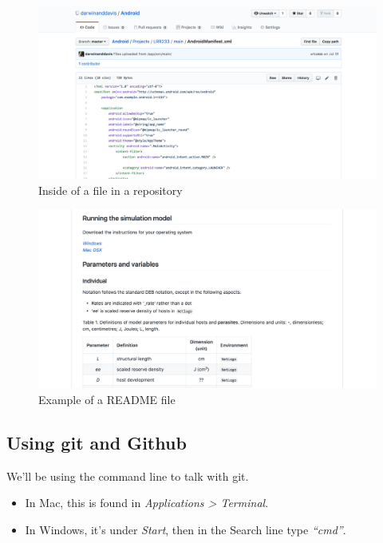 \documentclass[10,portrait]{article}
\providecommand{\tightlist}{%
  \setlength{\itemsep}{0pt}\setlength{\parskip}{0pt}}
\begin{document}
\begin{figure}
\centering
\includegraphics{filepage.png}
\caption{Inside of a file in a repository}
\end{figure}

\begin{figure}
\centering
\includegraphics{readme.png}
\caption{Example of a README file}
\end{figure}

\newpage     

\subsection{Using git and Github}\label{using-git-and-github}

We'll be using the command line to talk with git.

\begin{itemize}
\tightlist
\item
  In Mac, this is found in \emph{Applications \textgreater{}
  Terminal}.\\
\item
  In Windows, it's under \emph{Start}, then in the Search line type
  \emph{``cmd''}.
\end{itemize}
\end{document}
